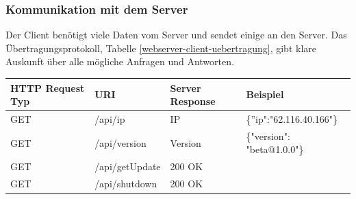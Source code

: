 \subsubsection{Kommunikation mit dem Server}
\label{sec:ums-client-kommunikation}
Der Client benötigt viele Daten vom Server und sendet einige an den Server. Das Übertragungsprotokoll, Tabelle \ref{webserver-client-uebertragung}, gibt klare Auskunft über alle mögliche Anfragen und Antworten.
\begin{landscape}
\begin{table}[]
\begin{tabular}{@{}llll@{}}
\toprule
\multicolumn{1}{|l|}{\textbf{\ac{HTTP} Request Typ}} & \multicolumn{1}{l|}{\textbf{\ac{URI}}} & \multicolumn{1}{l|}{\textbf{Server Response}} & \multicolumn{1}{l|}{\textbf{Beispiel}}                                                                                                          \\ \midrule
\multicolumn{1}{|l|}{GET}  & \multicolumn{1}{l|}{/api/ip}                             & \multicolumn{1}{l|}{IP}                  & \multicolumn{1}{l|}{\{''ip":"62.116.40.166"\}}                                                                                                                                                                                                                       \\ \midrule
\multicolumn{1}{|l|}{GET}  & \multicolumn{1}{l|}{/api/version}                        & \multicolumn{1}{l|}{Version}             & \multicolumn{1}{l|}{\{"version": "beta@1.0.0"\}}                                                                                                                                                                                                                     \\ \midrule
\multicolumn{1}{|l|}{GET}  & \multicolumn{1}{l|}{/api/getUpdate}                      & \multicolumn{1}{l|}{200 OK}              & \multicolumn{1}{l|}{}                                                                                                                                                                                                                                                \\ \midrule
\multicolumn{1}{|l|}{GET}  & \multicolumn{1}{l|}{/api/shutdown}                       & \multicolumn{1}{l|}{200 OK}              & \multicolumn{1}{l|}{}                                                                                                                                                                                                                                                \\ \midrule

\end{tabular}
\end{table}
\end{landscape}
